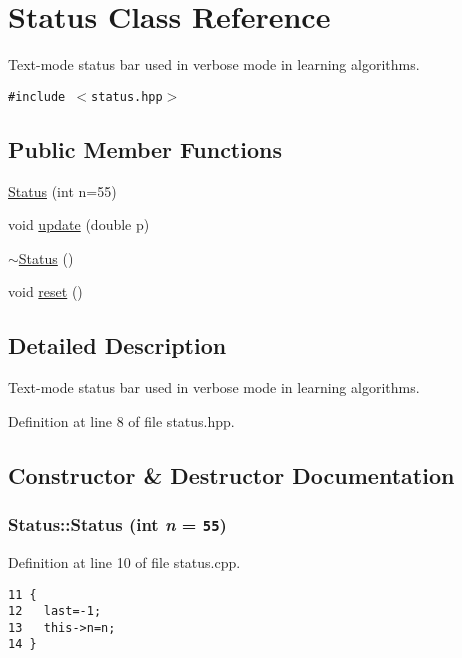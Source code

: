 \hypertarget{class_status}{
\section{Status Class Reference}
\label{class_status}
}
Text-mode status bar used in verbose mode in learning algorithms.  


{\tt \#include $<$status.hpp$>$}

\subsection*{Public Member Functions}
\begin{CompactItemize}
\item 
\hyperlink{class_status_e968b7176c1c82c8b020b1ac956ac882}{Status} (int n=55)
\item 
void \hyperlink{class_status_13804447fd8e38409dce866c8b77703f}{update} (double p)
\item 
\hyperlink{class_status_1b24d90ef2560afffe9d7183e279c63c}{$\sim$Status} ()
\item 
void \hyperlink{class_status_5fc321167c6d5eae2dde25c6e01aae8e}{reset} ()
\end{CompactItemize}


\subsection{Detailed Description}
Text-mode status bar used in verbose mode in learning algorithms. 



Definition at line 8 of file status.hpp.

\subsection{Constructor \& Destructor Documentation}
\hypertarget{class_status_e968b7176c1c82c8b020b1ac956ac882}{
\subsubsection[Status]{\setlength{\rightskip}{0pt plus 5cm}Status::Status (int {\em n} = {\tt 55})}}
\label{class_status_e968b7176c1c82c8b020b1ac956ac882}




Definition at line 10 of file status.cpp.

\begin{Code}\begin{verbatim}11 {
12   last=-1;
13   this->n=n;
14 }
\end{verbatim}\end{Code}


